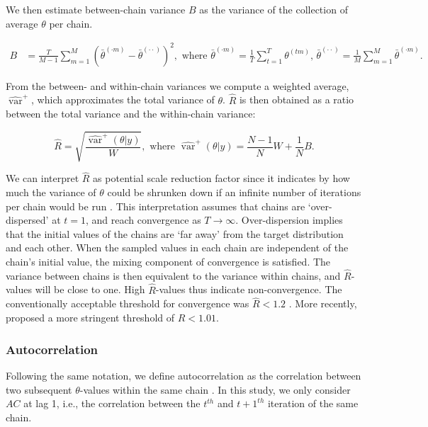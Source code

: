\documentclass[Royal,times,sageh]{sagej}
\begin{document}
\noindent We then estimate between-chain variance \(B\) as the variance of the collection of average \(\theta\) per chain.

\begin{align*}
B&=\frac{T}{M-1} \sum_{m=1}^{M}\left(\bar{\theta}^{(\cdot m)}-\bar{\theta}^{(\cdot \cdot)}\right)^{2}, \text { where } \bar{\theta}^{(\cdot m)}=\frac{1}{T} \sum_{t=1}^{T} \theta^{(t m)} \text{, } \bar{\theta}^{(\cdot \cdot)}=\frac{1}{M} \sum_{m=1}^{M} \bar{\theta}^{(\cdot m)}. 
\end{align*}

\noindent From the between- and within-chain variances we compute a weighted average, \(\widehat{\operatorname{var}}^{+}\), which approximates the total variance of \(\theta\). \(\widehat{R}\) is then obtained as a ratio between the total variance and the within-chain variance:

\begin{equation*}
\widehat{R}=\sqrt{\frac{\widehat{\operatorname{var}}^{+}(\theta | y)}{W}},
\text{ where } \widehat{\operatorname{var}}^{+}(\theta | y)=\frac{N-1}{N} W+\frac{1}{N} B.
\end{equation*}

We can interpret \(\widehat{R}\) as potential scale reduction factor since it indicates by how much the variance of \(\theta\) could be shrunken down if an infinite number of iterations per chain would be run \citep{gelm92}. This interpretation assumes that chains are `over-dispersed' at \(t=1\), and reach convergence as \(T \to \infty\). Over-dispersion implies that the initial values of the chains are `far away' from the target distribution and each other. When the sampled values in each chain are independent of the chain's initial value, the mixing component of convergence is satisfied. The variance between chains is then equivalent to the variance within chains, and \(\widehat{R}\)-values will be close to one. High \(\widehat{R}\)-values thus indicate non-convergence. The conventionally acceptable threshold for convergence was \(\widehat{R} < 1.2\) \citep{gelm92}. More recently, \citet{veht19} proposed a more stringent threshold of \(\widehat{R} < 1.01\).

\hypertarget{autocorrelation}{%
\subsubsection{Autocorrelation}\label{autocorrelation}}

Following the same notation, we define autocorrelation as the correlation between two subsequent \(\theta\)-values within the same chain \citep[p.~147]{lync07}. In this study, we only consider \(AC\) at lag 1, i.e., the correlation between the \(t^{th}\) and \(t+1^{th}\) iteration of the same chain.
\end{document}
